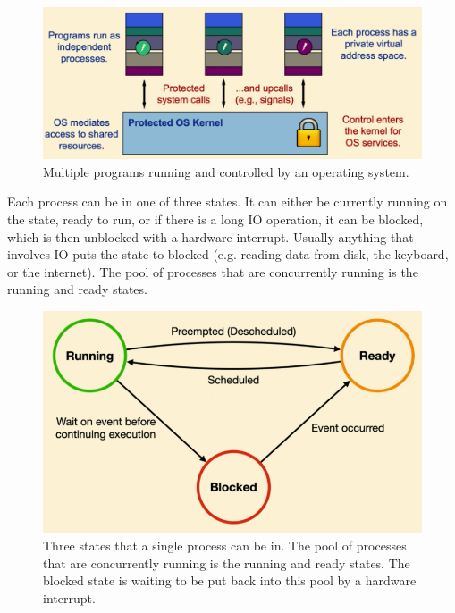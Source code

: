 \documentclass{article}
\begin{document}
    \begin{figure}[H]
      \centering 
      \includegraphics[scale=0.3]{img/os_multiple_programs.png}
      \caption{Multiple programs running and controlled by an operating system.} 
      \label{fig:os_multiple_programs}
    \end{figure}

    Each process can be in one of three states. It can either be currently running on the state, ready to run, or if there is a long IO operation, it can be blocked, which is then unblocked with a hardware interrupt. Usually anything that involves IO puts the state to blocked (e.g. reading data from disk, the keyboard, or the internet). The pool of processes that are concurrently running is the running and ready states. 
    \begin{figure}[H]
      \centering 
      \includegraphics[scale=0.4]{img/3_process_states.png}
      \caption{Three states that a single process can be in. The pool of processes that are concurrently running is the running and ready states. The blocked state is waiting to be put back into this pool by a hardware interrupt.} 
      \label{fig:3_process_states}
    \end{figure}
\end{document}
